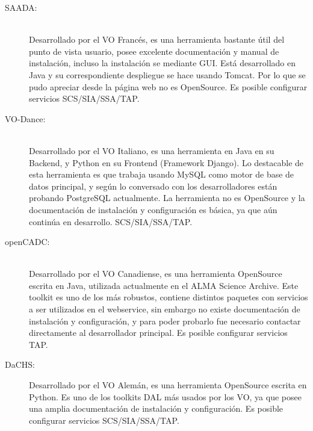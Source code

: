 \begin{description}
    \item[SAADA:] \hfill \\
        Desarrollado por el VO Francés, es una herramienta bastante útil del punto
        de vista usuario, posee excelente documentación y manual de instalación,
        incluso la instalación se mediante GUI.
        Está desarrollado en Java y su correspondiente despliegue se hace usando
        Tomcat.
        Por lo que se pudo apreciar desde la página web no es OpenSource.
        Es posible configurar servicios SCS/SIA/SSA/TAP.

    \item[VO-Dance:] \hfill \\
        Desarrollado por el VO Italiano, es una herramienta en Java en su Backend,
        y Python en su Frontend (Framework Django).
        Lo destacable de esta herramienta es que trabaja usando MySQL como motor de
        base de datos principal, y según lo conversado con los desarrolladores están
        probando PostgreSQL actualmente.
        La herramienta no es OpenSource y la documentación de instalación y
        configuración es básica, ya que aún continúa en desarrollo. SCS/SIA/SSA/TAP.

    \item[openCADC:] \hfill \\
        Desarrollado por el VO Canadiense, es una herramienta OpenSource escrita en
        Java, utilizada actualmente en el ALMA Science Archive.
        Este toolkit es uno de los más robustos, contiene distintos paquetes con
        servicios a ser utilizados en el webservice, sin embargo no existe
        documentación de instalación y configuración, y para poder probarlo fue
        necesario contactar directamente al desarrollador principal.
        Es posible configurar servicios TAP.

    \item[DaCHS:] Desarrollado por el VO Alemán, es una herramienta OpenSource
        escrita en Python.
        Es uno de los toolkits DAL más usados por los VO, ya que posee una amplia
        documentación de instalación y configuración.
        Es posible configurar servicios SCS/SIA/SSA/TAP.
\end{description}

